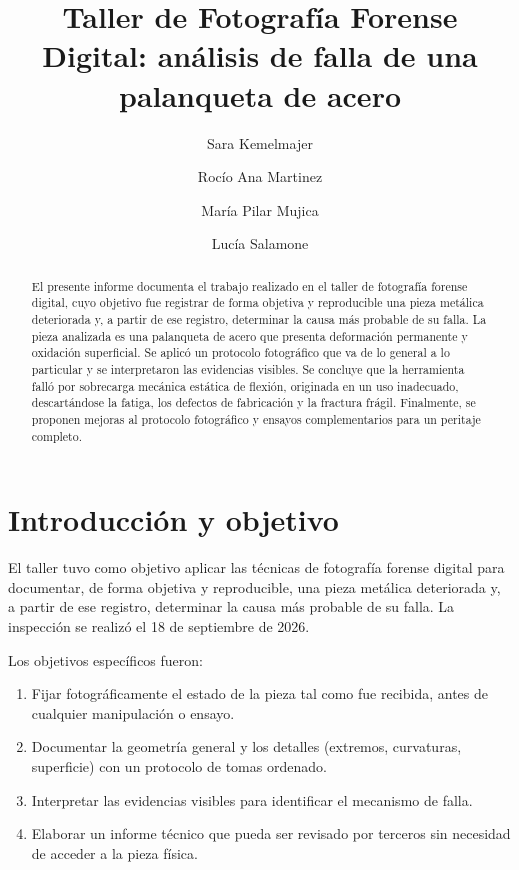 \documentclass[runningheads]{llncs}
\begin{document}
\title{Taller de Fotografía Forense Digital: análisis de falla de una palanqueta de acero}

\author{Sara Kemelmajer \and Rocío Ana Martinez \and María Pilar Mujica \and Lucía Salamone}



\maketitle

\begin{abstract}
El presente informe documenta el trabajo realizado en el taller de fotografía forense digital, cuyo objetivo fue registrar de forma objetiva y reproducible una pieza metálica deteriorada y, a partir de ese registro, determinar la causa más probable de su falla. La pieza analizada es una palanqueta de acero que presenta deformación permanente y oxidación superficial. Se aplicó un protocolo fotográfico que va de lo general a lo particular y se interpretaron las evidencias visibles. Se concluye que la herramienta falló por sobrecarga mecánica estática de flexión, originada en un uso inadecuado, descartándose la fatiga, los defectos de fabricación y la fractura frágil. Finalmente, se proponen mejoras al protocolo fotográfico y ensayos complementarios para un peritaje completo.

\end{abstract}

\section{Introducción y objetivo}

El taller tuvo como objetivo aplicar las técnicas de fotografía forense digital para documentar, de forma objetiva y reproducible, una pieza metálica deteriorada y, a partir de ese registro, determinar la causa más probable de su falla. La inspección se realizó el 18 de septiembre de 2026.

Los objetivos específicos fueron:

\begin{enumerate}
\item Fijar fotográficamente el estado de la pieza tal como fue recibida, antes de cualquier manipulación o ensayo.
\item Documentar la geometría general y los detalles (extremos, curvaturas, superficie) con un protocolo de tomas ordenado.
\item Interpretar las evidencias visibles para identificar el mecanismo de falla.
\item Elaborar un informe técnico que pueda ser revisado por terceros sin necesidad de acceder a la pieza física.
\end{enumerate}
\end{document}
